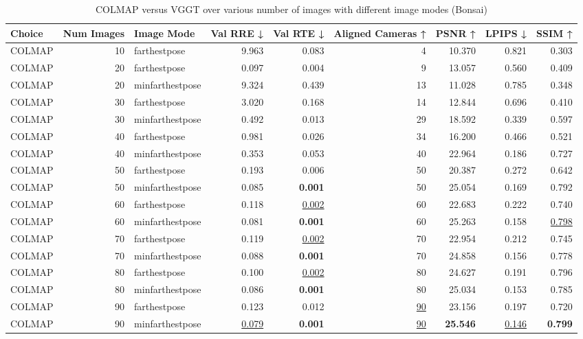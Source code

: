 \begin{table}[H]
\caption{COLMAP versus VGGT over various number of images with different image modes (Bonsai)}
\label{tab:01_num_images_image_mode_bonsai}
\centering
\scriptsize
\begin{tabular}{lrlrrrrrr}
\toprule
Choice & Num Images & Image Mode & Val RRE ↓ & Val RTE ↓ & Aligned Cameras ↑ & PSNR ↑ & LPIPS ↓ & SSIM ↑ \\
\midrule
COLMAP & 10 & farthestpose & 9.963 & 0.083 & 4 & 10.370 & 0.821 & 0.303 \\
COLMAP & 20 & farthestpose & 0.097 & 0.004 & 9 & 13.057 & 0.560 & 0.409 \\
COLMAP & 20 & minfarthestpose & 9.324 & 0.439 & 13 & 11.028 & 0.785 & 0.348 \\
COLMAP & 30 & farthestpose & 3.020 & 0.168 & 14 & 12.844 & 0.696 & 0.410 \\
COLMAP & 30 & minfarthestpose & 0.492 & 0.013 & 29 & 18.592 & 0.339 & 0.597 \\
COLMAP & 40 & farthestpose & 0.981 & 0.026 & 34 & 16.200 & 0.466 & 0.521 \\
COLMAP & 40 & minfarthestpose & 0.353 & 0.053 & 40 & 22.964 & 0.186 & 0.727 \\
COLMAP & 50 & farthestpose & 0.193 & 0.006 & 50 & 20.387 & 0.272 & 0.642 \\
COLMAP & 50 & minfarthestpose & 0.085 & \textbf{0.001} & 50 & 25.054 & 0.169 & 0.792 \\
COLMAP & 60 & farthestpose & 0.118 & \underline{0.002} & 60 & 22.683 & 0.222 & 0.740 \\
COLMAP & 60 & minfarthestpose & 0.081 & \textbf{0.001} & 60 & 25.263 & 0.158 & \underline{0.798} \\
COLMAP & 70 & farthestpose & 0.119 & \underline{0.002} & 70 & 22.954 & 0.212 & 0.745 \\
COLMAP & 70 & minfarthestpose & 0.088 & \textbf{0.001} & 70 & 24.858 & 0.156 & 0.778 \\
COLMAP & 80 & farthestpose & 0.100 & \underline{0.002} & 80 & 24.627 & 0.191 & 0.796 \\
COLMAP & 80 & minfarthestpose & 0.086 & \textbf{0.001} & 80 & 25.034 & 0.153 & 0.785 \\
COLMAP & 90 & farthestpose & 0.123 & 0.012 & \underline{90} & 23.156 & 0.197 & 0.720 \\
COLMAP & 90 & minfarthestpose & \underline{0.079} & \textbf{0.001} & \underline{90} & \textbf{25.546} & \underline{0.146} & \textbf{0.799} \\

\end{tabular}
\end{table}
